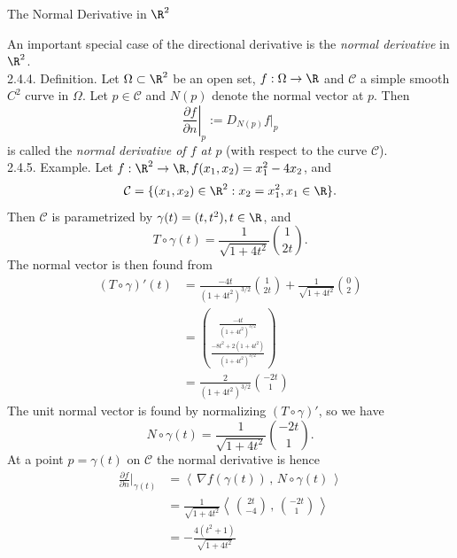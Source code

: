 \documentclass[smaller,hyperref={CJKbookmarks=true}]{beamer}
\newcommand{\scp}[2]{\left\langle\,#1\,,\,#2\,\right\rangle} \newcommand{\scpp}{\langle\,\cdot\,,\,\cdot\,\rangle}
\begin{document}
\begin{frame}{The Normal Derivative in $\R^2$}
\begin{spacing}{1.05}
An important special case of the directional derivative is the \emph{normal
derivative} in $\R^2$.\\
\alert{2.4.4. Definition.} Let $\Omega\subset\R^2$ be an open set, $f:\Omega\to\R$ and $\mathcal{C}$ a simple smooth $C^2$ curve in $\Omega$. Let $p\in\mathcal{C}$ and $N(p)$ denote the normal vector at $p$. Then
\[\left.\frac{\partial f}{\partial n}\right|_p:=D_{N(p)}f|_p\]
is called the \emph{normal derivative of $f$ at $p$} (with respect to the curve $\mathcal{C}$).\\[5pt]
\alert{2.4.5. Example.} Let $f:\R^2\to\R,f(x_1,x_2)=x_1^2-4x_2$, and
\[\mathcal{C}=\{(x_1,x_2)\in\R^2:x_2=x_1^2,
x_1\in\R\}.\]
\vspace*{-4pt}
Then $\mathcal{C}$ is parametrized by $\gamma(t)=(t,t^2),t\in\R$, and
\[T\circ\gamma(t)=\frac{1}{\sqrt{1+4t^2}}\binom{1}{2t}.\]
\newpage
The normal vector is then found from
\begin{equation*}
  \begin{split}
     (T\circ\gamma)'(t) &=\frac{-4t}{(1+4t^2)^{3/2}}\binom{1}{2t}+
     \frac{1}{\sqrt{1+4t^2}}\binom{0}{2} \\
       &=\binom{\frac{-4t}{(1+4t^2)^{3/2}}}{\frac{-8t^2+2(1+4t^2)}{(1+4t^2)^{3/2}}}  \\
       &=\frac{2}{(1+4t^2)^{3/2}}\binom{-2t}{1}
  \end{split}
\end{equation*}
The unit normal vector is found by normalizing $(T\circ\gamma)'$, so we have
\[N\circ\gamma(t)=\frac{1}{\sqrt{1+4t^2}}\binom{-2t}{1}.\]
\newpage
\vspace*{20pt}
At a point $p=\gamma(t)$ on $\mathcal{C}$ the normal derivative is hence
\begin{equation*}
  \begin{split}
     \frac{\partial f}{\partial n}\Big|_{\gamma(t)} &=\scp{\nabla f(\gamma(t))}{N\circ\gamma(t)} \\
       &=\frac{1}{\sqrt{1+4t^2}}\scp{\binom{2t}{-4}}{\binom{-2t}{1}}  \\
       &=-\frac{4(t^2+1)}{\sqrt{1+4t^2}}
  \end{split}
\end{equation*}
\end{spacing}
\end{frame}
\end{document}
